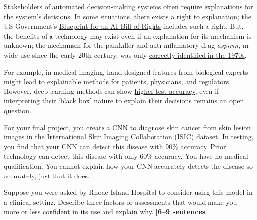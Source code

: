 \documentclass{csci1430}
\begin{document}
\begin{question}[points=6,drawbox=false] 
Stakeholders of automated decision-making systems often require explanations for the system's decisions. In some situations, there exists a \href{https://en.wikipedia.org/wiki/Right_to_explanation}{right to explanation}; the US Government's \href{https://www.whitehouse.gov/ostp/ai-bill-of-rights/}{Blueprint for an AI Bill of Rights} includes such a right. But, the benefits of a technology may exist even if an explanation for its mechanism is unknown; the mechanism for the painkiller and anti-inflamatory drug \emph{aspirin}, in wide use since the early 20th century, was only \href{https://en.wikipedia.org/wiki/History_of_aspirin#Investigating_how_aspirin_works}{correctly identified in the 1970s}.

For example, in medical imaging, hand designed features from biological experts might lead to explainable methods for patients, physicians, and regulators. However, deep learning methods can show \href{https://drive.google.com/file/d/1bDAqEtW482OJeqMBt5A4AradVa4gf_o9/view}{higher test accuracy}, even if interpreting their `black box' nature to explain their decisions remains an open question.

For your final project, you create a CNN to diagnose skin cancer from skin lesion images in the \href{https://challenge2020.isic-archive.com/}{International Skin Imaging Collaboration (ISIC) dataset}. In testing, you find that your CNN can detect this disease with 90\% accuracy. Prior technology can detect this disease with only 60\% accuracy. You have no medical qualification. You cannot explain how your CNN accurately detects the disease so accurately, just that it does.
\end{question}

\begin{subquestion}
Suppose you were asked by Rhode Island Hospital to consider using this model in a clinical setting. Describe three factors or assessments that would make you more or less confident in its use and explain why. \textbf{[6--9 sentences]}
\end{subquestion}

\begin{answer}[height=22]

\end{answer}
\end{document}
